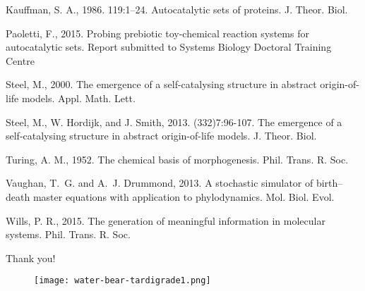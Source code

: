 \documentclass{beamer}
\begin{document}
\begin{frame}[allowframebreaks]
\begin{thebibliography}{99}
{\sc Kauffman, S. A.}, 1986. 119:1–24.
Autocatalytic sets of proteins.
\newblock J. Theor. Biol.

{\sc Paoletti, F.}, 2015.
Probing prebiotic toy-chemical reaction systems for autocatalytic sets.
\newblock Report submitted to Systems Biology Doctoral Training Centre

{\sc Steel, M.}, 2000.
The emergence of a self-catalysing structure in abstract origin-of-life models.
\newblock Appl. Math. Lett.

{\sc Steel, M.}, {\sc W. Hordijk}, and {\sc J. Smith}, 2013. (332)7:96-107.
The emergence of a self-catalysing structure in abstract origin-of-life models.
\newblock J. Theor. Biol.

{\sc Turing, A. M.}, 1952.
The chemical basis of morphogenesis.
\newblock Phil. Trans. R. Soc.

{\sc Vaughan, T.~G.} and {\sc A.~J. Drummond}, 2013.
A stochastic simulator of birth–death master equations with application to phylodynamics.
\newblock Mol. Biol. Evol.

{\sc Wills, P. R.}, 2015.
The generation of meaningful information in molecular systems.
\newblock Phil. Trans. R. Soc.
 
\end{thebibliography}
\end{frame}

\begin{frame}
\begin{center}
Thank you!
\begin{figure}
    \centering
    	\texttt{[image: water-bear-tardigrade1.png]}
\end{figure}
\end{center}
\end{frame}
\end{document}
